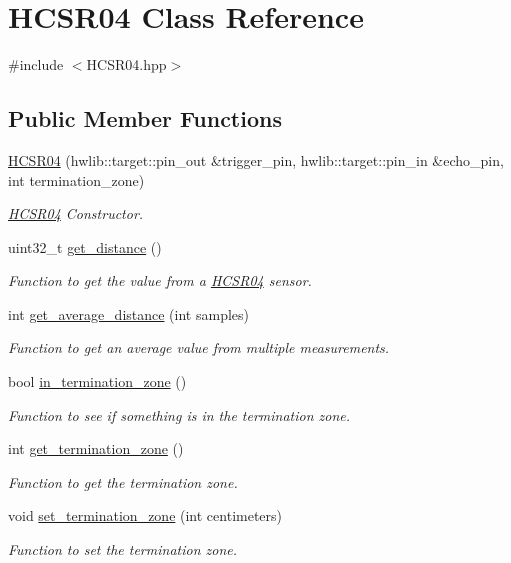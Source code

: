 \hypertarget{class_h_c_s_r04}{}\section{H\+C\+S\+R04 Class Reference}
\label{class_h_c_s_r04}


{\ttfamily \#include $<$H\+C\+S\+R04.\+hpp$>$}

\subsection*{Public Member Functions}
\begin{DoxyCompactItemize}
\item 
\hyperlink{class_h_c_s_r04_ac75fefd776d1b35bfd6589ac40ff904e}{H\+C\+S\+R04} (hwlib\+::target\+::pin\+\_\+out \&trigger\+\_\+pin, hwlib\+::target\+::pin\+\_\+in \&echo\+\_\+pin, int termination\+\_\+zone)
\begin{DoxyCompactList}\small\item\em \hyperlink{class_h_c_s_r04}{H\+C\+S\+R04} Constructor. \end{DoxyCompactList}\item 
uint32\+\_\+t \hyperlink{class_h_c_s_r04_a6f0e9830e49a9f482211890ca87e98c4}{get\+\_\+distance} ()
\begin{DoxyCompactList}\small\item\em Function to get the value from a \hyperlink{class_h_c_s_r04}{H\+C\+S\+R04} sensor. \end{DoxyCompactList}\item 
int \hyperlink{class_h_c_s_r04_aec660395befa5be0a49315352dd8589f}{get\+\_\+average\+\_\+distance} (int samples)
\begin{DoxyCompactList}\small\item\em Function to get an average value from multiple measurements. \end{DoxyCompactList}\item 
bool \hyperlink{class_h_c_s_r04_aa96fffeea68bcb19249ffaf763520ed4}{in\+\_\+termination\+\_\+zone} ()
\begin{DoxyCompactList}\small\item\em Function to see if something is in the termination zone. \end{DoxyCompactList}\item 
int \hyperlink{class_h_c_s_r04_a0b796d03c8bfc551d5af8cb9b776c0f1}{get\+\_\+termination\+\_\+zone} ()
\begin{DoxyCompactList}\small\item\em Function to get the termination zone. \end{DoxyCompactList}\item 
void \hyperlink{class_h_c_s_r04_aebbf05553e7818475e4846422088806e}{set\+\_\+termination\+\_\+zone} (int centimeters)
\begin{DoxyCompactList}\small\item\em Function to set the termination zone. \end{DoxyCompactList}\end{DoxyCompactItemize}


